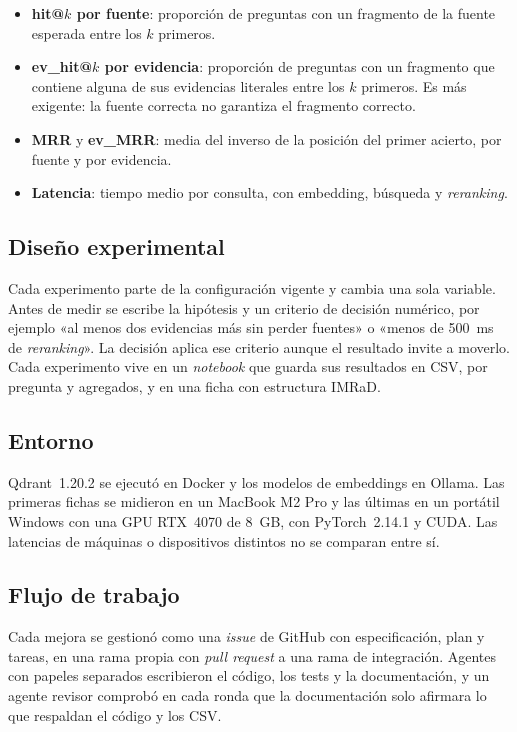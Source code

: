 \documentclass[pdflatex,sn-mathphys-num]{sn-jnl}
\begin{document}
\begin{itemize}
\item \textbf{hit@$k$ por fuente}: proporción de preguntas con un fragmento de la fuente esperada entre los $k$ primeros.
\item \textbf{ev\_hit@$k$ por evidencia}: proporción de preguntas con un fragmento que contiene alguna de sus evidencias literales entre los $k$ primeros. Es más exigente: la fuente correcta no garantiza el fragmento correcto.
\item \textbf{MRR} y \textbf{ev\_MRR}: media del inverso de la posición del primer acierto, por fuente y por evidencia.
\item \textbf{Latencia}: tiempo medio por consulta, con embedding, búsqueda y \emph{reranking}.
\end{itemize}

\subsection{Diseño experimental}

Cada experimento parte de la configuración vigente y cambia una sola variable. Antes de medir se escribe la hipótesis y un criterio de decisión numérico, por ejemplo «al menos dos evidencias más sin perder fuentes» o «menos de 500~ms de \emph{reranking}». La decisión aplica ese criterio aunque el resultado invite a moverlo. Cada experimento vive en un \emph{notebook} que guarda sus resultados en CSV, por pregunta y agregados, y en una ficha con estructura IMRaD.

\subsection{Entorno}

Qdrant~1.20.2 se ejecutó en Docker y los modelos de embeddings en Ollama. Las primeras fichas se midieron en un MacBook M2 Pro y las últimas en un portátil Windows con una GPU RTX~4070 de 8~GB, con PyTorch~2.14.1 y CUDA. Las latencias de máquinas o dispositivos distintos no se comparan entre sí.

\subsection{Flujo de trabajo}

Cada mejora se gestionó como una \emph{issue} de GitHub con especificación, plan y tareas, en una rama propia con \emph{pull request} a una rama de integración. Agentes con papeles separados escribieron el código, los tests y la documentación, y un agente revisor comprobó en cada ronda que la documentación solo afirmara lo que respaldan el código y los CSV.
\end{document}
